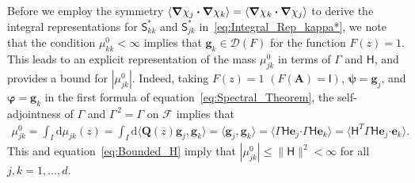 \documentclass[leqno,onefignum,onetabnum]{siamltex1213}
\renewcommand{\d}{\mathrm{d}}
\newcommand{\Ab}{\mathbf{A}}
\newcommand{\Qb}{\mathbf{Q}}
\newcommand{\Fc}{\mathcal{F}}
\newcommand{\Hm}{\mathsf{H}}
\newcommand{\Sm}{\mathsf{S}}
\newcommand{\Ib}{\mathsf{I}}
\newcommand{\Ds}{\mathscr{D}}
\newcommand\bnabla{\mbox{\boldmath${\nabla}$}}
\providecommand\bcdot{\boldsymbol{\cdot}}
\newcommand{\vecg}{\boldsymbol{g}}
\newcommand{\vece}{\boldsymbol{e}}
\newcommand{\vecpsi}{\boldsymbol{\psi}}
\newcommand{\vecvarphi}{\boldsymbol{\varphi}}
\begin{document}
Before we employ the symmetry
$\langle\bnabla \chi_j\bcdot\bnabla \chi_k\rangle=\langle\bnabla \chi_k\bcdot\bnabla \chi_j\rangle$ to derive the 
integral representations for $\Sm^*_{kk}$ and $\Sm^*_{jk}$
in~\eqref{eq:Integral_Rep_kappa*},  we note that the condition 
$\mu^0_{kk}<\infty$ implies that $\vecg_k\in\Ds(F)$ for the function 
$F(z)=1$. This leads to an explicit representation of the mass
$\mu^0_{jk}$ in terms of $\Gamma$ and $\Hm$, and provides a bound for
$|\mu^0_{jk}|$. Indeed, taking $F(z)=1$ $(F(\Ab)=\Ib)$, 
$\vecpsi=\vecg_j$, and $\vecvarphi=\vecg_k$ in the first formula of
equation~\eqref{eq:Spectral_Theorem}, the self-adjointness of $\Gamma$
and $\Gamma^{\,2}=\Gamma$ on $\Fc$ implies that   
%
\begin{align}\label{eq:Mass}
  \mu^0_{jk}=\int_I\d\mu_{jk}(z)
        =\int_I\d\langle\Qb(z)\vecg_j,\vecg_k\rangle
        =\langle\vecg_j,\vecg_k\rangle
        =\langle\Gamma\Hm\vece _j\bcdot\Gamma\Hm\vece _k\rangle 
        =\langle\Hm^T\Gamma\Hm\vece _j\bcdot\vece _k\rangle.     
\end{align}
%
This and equation~\eqref{eq:Bounded_H} imply that
$|\mu^0_{jk}|\leq\|\Hm\|^2<\infty$ for all $j,k=1,\ldots,d$.  
\end{document}
